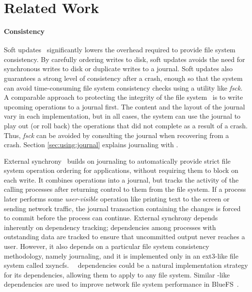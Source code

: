 \section{Related Work}
\label{sec:related}

\paragraph{Consistency}

Soft updates~\cite{ganger00soft} significantly lowers the overhead required to
provide file system consistency. By carefully ordering writes to disk, soft
updates avoids the need for synchronous writes to disk or duplicate writes to
a journal. Soft updates also guarantees a strong level of consistency after a
crash, enough so that the system can avoid time-consuming file system
consistency checks using a utility like \emph{fsck}. 
%
A comparable approach to protecting the integrity of the file
system~\cite{seltzer00journaling} is to write
upcoming operations to a journal first. The content and the layout of the
journal vary in each implementation, but in all cases, the system can use the
journal to play out (or roll back) the operations that did not complete as a
result of a crash. Thus, \emph{fsck} can be avoided by consulting the journal
when recovering from a crash.  Section \ref{sec:using:journal} explains
journaling with \patches.

External synchrony~\cite{nightingale06rethink} builds on journaling to
automatically provide strict file system operation ordering for applications,
without requiring them to block on each write. It combines operations into a
journal, but tracks the activity of the calling processes after returning
control to them from the file system. If a process later performs some
\emph{user-visible} operation like printing text to the screen or sending
network traffic, the journal transaction containing the changes is forced to
commit before the process can continue.
%
External synchrony depends inherently on dependency tracking; dependencies
among processes with outstanding data are tracked to ensure that
uncommitted output never reaches a user. However, it also depends on a
particular file system consistency methodology, namely journaling, and it
is implemented only in an ext3-like file system called xsyncfs. \Kudos\
\patch\ dependencies could be a natural implementation strategy for its
dependencies, allowing them to apply to any file system.
%
Similar \patch-like dependencies are used to improve network file system
performance in BlueFS~\cite{nightingale05speculative}.

